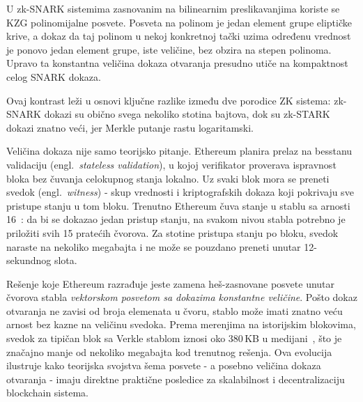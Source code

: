 U zk-SNARK sistemima zasnovanim na bilinearnim preslikavanjima koriste se KZG polinomijalne
posvete. Posveta na polinom je jedan element grupe eliptičke krive, a dokaz da taj polinom
u nekoj konkretnoj tački uzima određenu vrednost je ponovo jedan element grupe, iste
veličine, bez obzira na stepen polinoma. Upravo ta konstantna veličina dokaza otvaranja
presudno utiče na kompaktnost celog SNARK dokaza.

Ovaj kontrast leži u osnovi ključne razlike između dve porodice ZK sistema: zk-SNARK
dokazi su obično svega nekoliko stotina bajtova, dok su zk-STARK dokazi znatno veći,
jer Merkle putanje rastu logaritamski.

Veličina dokaza nije samo teorijsko pitanje. Ethereum planira prelaz na besstanu validaciju
(engl.\ \textit{stateless validation}), u kojoj verifikator proverava ispravnost bloka bez
čuvanja celokupnog stanja lokalno. Uz svaki blok mora se preneti svedok
(engl.\ \textit{witness}) - skup vrednosti i kriptografskih dokaza koji pokrivaju sve
pristupe stanju u tom bloku. Trenutno Ethereum čuva stanje u stablu sa arnosti 16~\cite{ethereumMPT}: da bi
se dokazao jedan pristup stanju, na svakom nivou stabla potrebno je priložiti svih 15
pratećih čvorova. Za stotine pristupa stanju po bloku, svedok naraste na nekoliko megabajta
i ne može se pouzdano preneti unutar 12-sekundnog slota.

Rešenje koje Ethereum razrađuje jeste zamena heš-zasnovane posvete unutar čvorova stabla
\emph{vektorskom posvetom sa dokazima konstantne veličine}. Pošto dokaz otvaranja ne
zavisi od broja elemenata u čvoru, stablo može imati znatno veću arnost bez kazne na
veličinu svedoka. Prema merenjima na istorijskim blokovima, svedok za tipičan blok sa
Verkle stablom iznosi oko 380\,KB u medijani~\cite{statelessfyi}, što je značajno manje
od nekoliko megabajta kod trenutnog rešenja. Ova evolucija ilustruje kako teorijska
svojstva šema posvete - a posebno veličina dokaza otvaranja - imaju direktne praktične
posledice za skalabilnost i decentralizaciju blockchain sistema.
